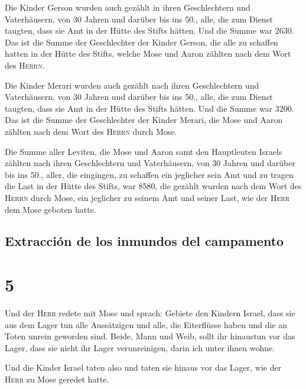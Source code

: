  Die Kinder Gerson wurden auch gezählt in ihren
Geschlechtern und Vaterhäusern,  von 30 Jahren und
darüber bis ins 50., alle, die zum Dienst taugten, dass sie Amt in der
Hütte des Stifts hätten.  Und die Summe war 2630.
 Das ist die Summe der Geschlechter der Kinder Gerson,
die alle zu schaffen hatten in der Hütte des Stifts, welche Mose und
Aaron zählten nach dem Wort des \textsc{Herrn}.

 Die Kinder Merari wurden auch gezählt nach ihren
Geschlechtern und Vaterhäusern,  von 30 Jahren und
darüber bis ins 50., alle, die zum Dienst taugten, dass sie Amt in der
Hütte des Stifts hätten.  Und die Summe war 3200.
 Das ist die Summe der Geschlechter der Kinder Merari,
die Mose und Aaron zählten nach dem Wort des \textsc{Herrn} durch Mose.

 Die Summe aller Leviten, die Mose und Aaron samt den
Hauptleuten Israels zählten nach ihren Geschlechtern und Vaterhäusern,
 von 30 Jahren und darüber bis ins 50., aller, die
eingingen, zu schaffen ein jeglicher sein Amt und zu tragen die Last in
der Hütte des Stifts,  war 8580,  die
gezählt wurden nach dem Wort des \textsc{Herrn} durch Mose, ein
jeglicher zu seinem Amt und seiner Last, wie der \textsc{Herr} dem Mose
geboten hatte.

\hypertarget{extracciuxf3n-de-los-inmundos-del-campamento}{%
\subsection{Extracción de los inmundos del
campamento}\label{extracciuxf3n-de-los-inmundos-del-campamento}}

\hypertarget{section-4}{%
\section{5}\label{section-4}}

 Und der \textsc{Herr} redete mit Mose und sprach:
 Gebiete den Kindern Israel, dass sie aus dem Lager tun
alle Aussätzigen und alle, die Eiterflüsse haben und die an Toten unrein
geworden sind.  Beide, Mann und Weib, sollt ihr hinaustun
vor das Lager, dass sie nicht ihr Lager verunreinigen, darin ich unter
ihnen wohne.

 Und die Kinder Israel taten also und taten sie hinaus vor
das Lager, wie der \textsc{Herr} zu Mose geredet hatte.


